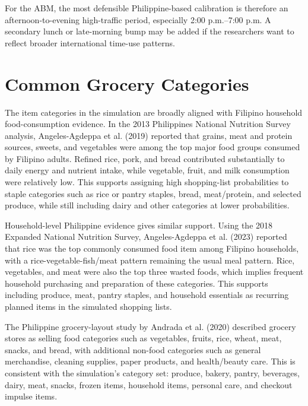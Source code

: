 \documentclass[12pt]{article}
\begin{document}
For the ABM, the most defensible Philippine-based calibration is therefore an afternoon-to-evening high-traffic period, especially 2:00 p.m.--7:00 p.m. A secondary lunch or late-morning bump may be added if the researchers want to reflect broader international time-use patterns.

\section{Common Grocery Categories}

The item categories in the simulation are broadly aligned with Filipino household food-consumption evidence. In the 2013 Philippines National Nutrition Survey analysis, Angeles-Agdeppa et al. (2019) reported that grains, meat and protein sources, sweets, and vegetables were among the top major food groups consumed by Filipino adults. Refined rice, pork, and bread contributed substantially to daily energy and nutrient intake, while vegetable, fruit, and milk consumption were relatively low. This supports assigning high shopping-list probabilities to staple categories such as rice or pantry staples, bread, meat/protein, and selected produce, while still including dairy and other categories at lower probabilities.

Household-level Philippine evidence gives similar support. Using the 2018 Expanded National Nutrition Survey, Angeles-Agdeppa et al. (2023) reported that rice was the top commonly consumed food item among Filipino households, with a rice-vegetable-fish/meat pattern remaining the usual meal pattern. Rice, vegetables, and meat were also the top three wasted foods, which implies frequent household purchasing and preparation of these categories. This supports including produce, meat, pantry staples, and household essentials as recurring planned items in the simulated shopping lists.

The Philippine grocery-layout study by Andrada et al. (2020) described grocery stores as selling food categories such as vegetables, fruits, rice, wheat, meat, snacks, and bread, with additional non-food categories such as general merchandise, cleaning supplies, paper products, and health/beauty care. This is consistent with the simulation's category set: produce, bakery, pantry, beverages, dairy, meat, snacks, frozen items, household items, personal care, and checkout impulse items.
\end{document}
